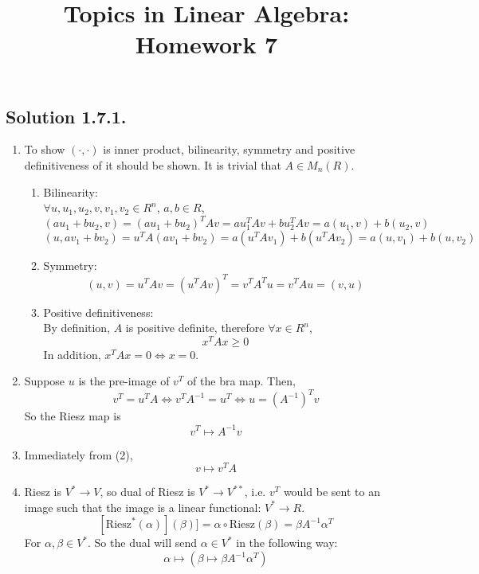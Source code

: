 \documentclass{article}
\title{Topics in Linear Algebra: Homework 7}
\begin{document}
\maketitle
\subsection*{Solution 1.7.1.}
\begin{enumerate}
    \item To show $(\cdot, \cdot)$ is inner product, bilinearity, symmetry and positive definitiveness of it should be shown. It is trivial that $A\in M_n(R)$.
    \begin{enumerate} [label = \roman*)]
        \item Bilinearity: \\
        $\forall u, u_1, u_2, v, v_1, v_2\in R ^ n$, $a,b\in R$,
        \[(au_1+bu_2,v) = (au_1+bu_2)^TAv = au_1^TAv + bu_2^TAv = a(u_1,v)+b(u_2,v)\]
        \[(u,av_1+bv_2) = u^TA(av_1+bv_2) = a(u^TAv_1)+b(u^TAv_2) = a(u,v_1)+b(u,v_2)\]
        \item Symmetry:
        \[(u,v) = u^TAv = (u^TAv)^T = v^T A^Tu = v^TAu =(v,u)\]
        \item Positive definitiveness: \\
        By definition, $A$ is positive definite, therefore $\forall x \in R ^ n$,
        \[x^TAx \geq 0\]
        In addition, $x^TAx = 0 \Leftrightarrow x = 0$.
    \end{enumerate}
    \item Suppose $u$ is the pre-image of $v^T$ of the bra map. Then,
    \[v^T = u^TA \Leftrightarrow v^TA ^{-1} = u^T \Leftrightarrow u = (A ^ {-1}) ^T v\]
    So the Riesz map is 
    \[v^T\mapsto A ^ {-1}v\]
    \item Immediately from (2),
    \[v \mapsto v^TA\]
    \item Riesz is $V^*\to V$, so dual of Riesz is $V^* \to V ^{**}$, i.e. $v^T$ would be sent to an image such that the image is a linear functional: $V^* \to R$.
    \[[\mathrm{Riesz} ^*(\alpha)](\beta)] = \alpha \circ \mathrm{Riesz}(\beta) = \beta A ^{-1} \alpha ^ T\]
    For $\alpha, \beta \in V ^*$. So the dual will send $\alpha \in V^*$ in the following way:
    \[\alpha\mapsto(\beta\mapsto \beta A^{-1} \alpha ^T)\]
\end{enumerate}
\end{document}
